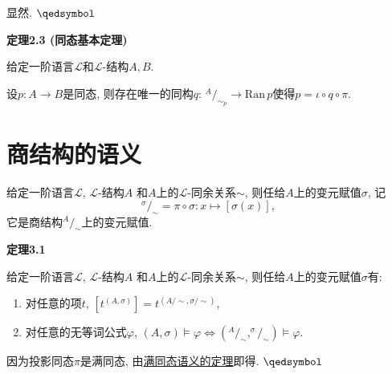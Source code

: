 \vspace{3pt}
 显然. \hfill $\qedsymbol$

\vspace{10pt}

\hypertarget{sec:定理2.3}{}
\noindent\textbf{定理2.3 (同态基本定理)}

给定一阶语言$\mathcal{L}$和$\mathcal{L}$-结构$A,B$.

设$p:A\to B$是同态, 则存在唯一的同构$q:\,^{\displaystyle A}\!/_{\displaystyle\sim_p}
\to\mathrm{Ran}\,p$使得$p=\iota\circ q\circ\pi$.





\newpage

\section{商结构的语义}

给定一阶语言$\mathcal{L}$, $\mathcal{L}$-结构$A$
和$A$上的$\mathcal{L}$-同余关系$\sim$, 则任给$A$上的变元赋值$\sigma$, 记
\[
    ^{\displaystyle\sigma}\!/_{\displaystyle\sim}=\pi\circ\sigma:
    x\mapsto[\sigma(x)],
\]
它是商结构$^{\displaystyle A}\!/_{\displaystyle\sim}$上的变元赋值.

\vspace{10pt}

\hypertarget{sec:定理3.1}{}
\noindent\textbf{定理3.1}

给定一阶语言$\mathcal{L}$, $\mathcal{L}$-结构$A$
和$A$上的$\mathcal{L}$-同余关系$\sim$, 则任给$A$上的变元赋值$\sigma$有:
\begin{enumerate}
    \item 对任意的项$t$, $[t^{(A,\sigma)}]=t^{(A/\sim,\sigma/\sim)}$,
    \item 对任意的无等词公式$\varphi$,
    $(A,\sigma)\models\varphi\iff\left(^{\displaystyle A}\!/_{\displaystyle\sim},
    ^{\displaystyle\sigma}\!/_{\displaystyle\sim}\right)\models\varphi$.
\end{enumerate}


因为投影同态$\pi$是满同态, 由\href{02 结构的同态#nameddest=sec:定理3.4}
{满同态语义的定理}即得. \hfill $\qedsymbol$


